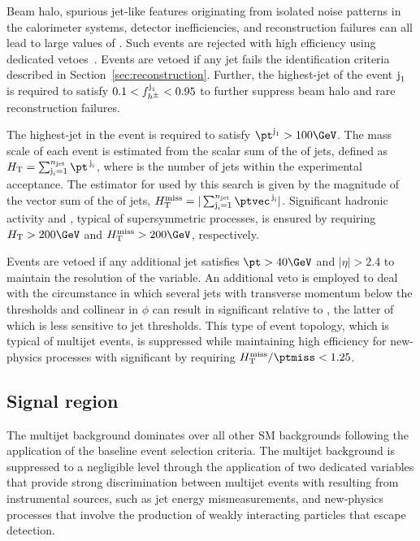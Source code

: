 Beam halo, spurious jet-like features originating from isolated noise
patterns in the calorimeter systems, detector inefficiencies, and
reconstruction failures can all lead to large values of \ptmiss. Such
events are rejected with high efficiency using dedicated
vetoes~\cite{CMS-PAS-JME-16-004, Khachatryan:2014gga}. Events are
vetoed if any jet fails the identification criteria described in
Section~\ref{sec:reconstruction}. Further, the highest-\pt jet of the
event $\jet{1}$ is required to satisfy $0.1 < f_{h^{\pm}}^{\jet{1}} <
0.95$ to further suppress beam halo and rare reconstruction failures.

The highest-\pt jet in the event is required to satisfy $\pt^{\jet{1}}
> 100\GeV$. The mass scale of each event is estimated from the scalar
sum of the \pt of jets, defined as $\scalht = \sum_{\jet{i} =
  1}^{\njet} \pt^{\,\jet{i}}$, where \njet is the number of jets
within the experimental acceptance. The estimator for \ptvecmiss used
by this search is given by the magnitude of the vector sum of the \pt
of jets, $\mht = |\sum_{\jet{i} = 1}^{\njet}
\ptvec^{\,\jet{i}}|$. Significant hadronic activity and \ptvecmiss,
typical of supersymmetric processes, is ensured by requiring $\scalht
> 200\GeV$ and $\mht > 200\GeV$, respectively.

Events are vetoed if any additional jet satisfies $\pt > 40\GeV$ and
$|\eta| > 2.4$ to maintain the resolution of the \mht variable.  An
additional veto is employed to deal with the circumstance in which
several jets with transverse momentum below the \pt thresholds and
collinear in $\phi$ can result in significant \mht relative to
\ptmiss, the latter of which is less sensitive to jet thresholds. This
type of event topology, which is typical of multijet events, is
suppressed while maintaining high efficiency for new-physics processes
with significant \ptvecmiss by requiring $\mhtmet < 1.25$.


\subsection{Signal region}
\label{sec:signal}

The multijet background dominates over all other SM backgrounds
following the application of the baseline event selection
criteria. The multijet background is suppressed to a negligible level
through the application of two dedicated variables that provide strong
discrimination between multijet events with \ptvecmiss resulting from
instrumental sources, such as jet energy mismeasurements, and
new-physics processes that involve the production of weakly
interacting particles that escape detection.

